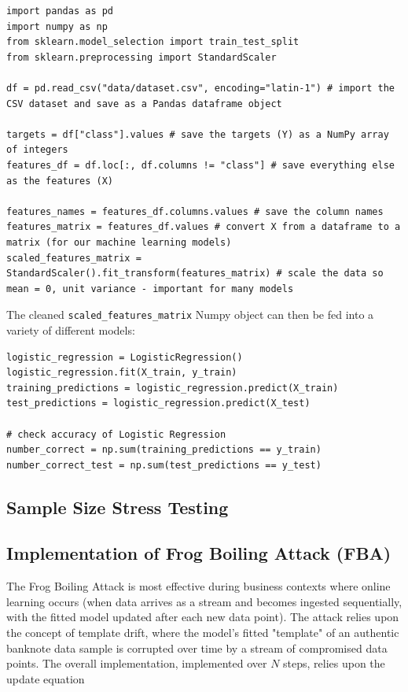\documentclass{article}
\begin{document}
\begin{lstlisting}
import pandas as pd
import numpy as np
from sklearn.model_selection import train_test_split
from sklearn.preprocessing import StandardScaler

df = pd.read_csv("data/dataset.csv", encoding="latin-1") # import the CSV dataset and save as a Pandas dataframe object
    
targets = df["class"].values # save the targets (Y) as a NumPy array of integers
features_df = df.loc[:, df.columns != "class"] # save everything else as the features (X)
    
features_names = features_df.columns.values # save the column names
features_matrix = features_df.values # convert X from a dataframe to a matrix (for our machine learning models)
scaled_features_matrix = StandardScaler().fit_transform(features_matrix) # scale the data so mean = 0, unit variance - important for many models
\end{lstlisting}

The cleaned \lstinline{scaled_features_matrix} Numpy object can then be fed into a variety of different models:

\begin{lstlisting}
logistic_regression = LogisticRegression()
logistic_regression.fit(X_train, y_train)
training_predictions = logistic_regression.predict(X_train)
test_predictions = logistic_regression.predict(X_test)

# check accuracy of Logistic Regression
number_correct = np.sum(training_predictions == y_train)
number_correct_test = np.sum(test_predictions == y_test)
\end{lstlisting}

\subsection{Sample Size Stress Testing}

\subsection{Implementation of Frog Boiling Attack (FBA)}

The Frog Boiling Attack is most effective during business contexts where online learning occurs (when data arrives as a stream and becomes ingested sequentially, with the fitted model updated after each new data point). The attack relies upon the concept of template drift\cite{template_drift}, where the model's fitted "template" of an authentic banknote data sample is corrupted over time by a stream of compromised data points. The overall implementation, implemented over $N$ steps, relies upon the update equation
\end{document}
